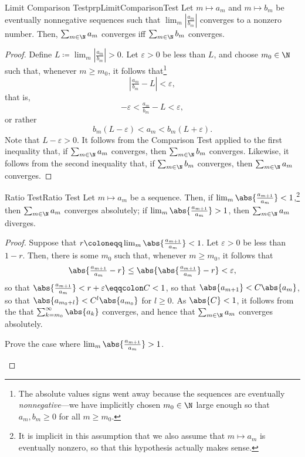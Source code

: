 \begin{prp}{Limit Comparison Test}{prpLimitComparisonTest}
Let $m\mapsto a_m$ and $m\mapsto b_m$ be eventually nonnegative sequences such that $\lim _m\left| \frac{a_m}{b_m}\right|$ converges to a nonzero number.  Then, $\sum _{m\in \N}a_m$ converges iff $\sum _{m\in \N}b_m$ converges.
\begin{proof}
Define $L\coloneqq \lim _m\left| \frac{a_m}{b_m}\right| >0$.  Let $\varepsilon >0$ be less than $L$, and choose $m_0\in \N$ such that, whenever $m\geq m_0$, it follows that\footnote{The absolute values signs went away because the sequences are eventually \emph{nonnegative}---we have implicitly chosen $m_0\in \N$ large enough so that $a_m,b_m\geq 0$ for all $m\geq m_0$.}
\begin{equation}
\left| \tfrac{a_m}{b_m}-L\right| <\varepsilon ,
\end{equation}
that is,
\begin{equation}
-\varepsilon <\tfrac{a_m}{b_m}-L<\varepsilon ,
\end{equation}
or rather
\begin{equation}
b_m(L-\varepsilon )<a_m<b_m(L+\varepsilon ).
\end{equation}
Note that $L-\varepsilon >0$.  It follows from the Comparison Test applied to the first inequality that, if $\sum _{m\in \N}a_m$ converges, then $\sum _{m\in \N}b_m$ converges.  Likewise, it follows from the second inequality that, if $\sum _{m\in \N}b_m$ converges, then $\sum _{m\in \N}a_m$ converges.
\end{proof}
\end{prp}
\begin{prp}{Ratio Test}{Ratio Test}
Let $m\mapsto a_m$ be a sequence.  Then, if $\lim _m\abs{\frac{a_{m+1}}{a_m}}<1$,\footnote{It is implicit in this assumption that we also assume that $m\mapsto a_m$ is eventually nonzero, so that this hypothesis actually makes sense.} then $\sum _{m\in \N}a_m$ converges absolutely; if $\lim _m\abs{\frac{a_{m+1}}{a_m}}>1$, then $\sum _{m\in \N}a_m$ diverges.
\begin{proof}
Suppose that $r\coloneqq \lim _m\abs{\frac{a_{m+1}}{a_m}}<1$.  Let $\varepsilon >0$ be less than $1-r$.  Then, there is some $m_0$ such that, whenever $m\geq m_0$, it follows that
\begin{equation}
\abs{\tfrac{a_{m+1}}{a_m}-r}\leq \abs{\abs{\tfrac{a_{m+1}}{a_m}}-r}<\varepsilon ,
\end{equation}
so that $\abs{\frac{a_{m+1}}{a_m}}<r+\varepsilon \eqqcolon C<1$, so that $\abs{a_{m+1}}<C\abs{a_m}$, so that $\abs{a_{m_0+l}}<C^l\abs{a_{m_0}}$ for $l\geq 0$.  As $\abs{C}<1$, it follows from the  that $\sum _{k=m_0}^{\infty}\abs{a_k}$ converges, and hence that $\sum _{m\in \N}a_m$ converges absolutely.

\begin{exr}[breakable=false]{}{}
Prove the case where $\lim _m\abs{\frac{a_{m+1}}{a_m}}>1$.
\end{exr}
\end{proof}
\end{prp}
